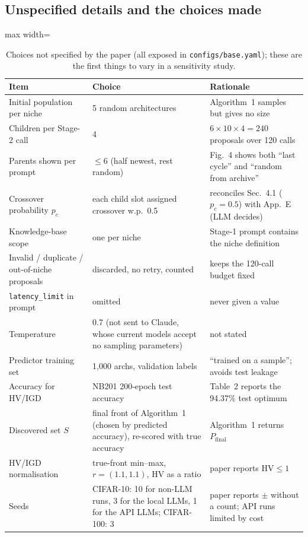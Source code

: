 \documentclass[preprint,12pt,authoryear]{elsarticle}
\newcommand{\code}[1]{\texttt{#1}}
\newcommand{\HV}{\mathrm{HV}}
\begin{document}
\subsection{Unspecified details and the choices made}\label{sec:assumed}
\begin{table}[h]\centering\small
\caption{Choices not specified by the paper (all exposed in \code{configs/base.yaml}); these are the first things to vary in a sensitivity study.}\label{tab:assumed}
\begin{adjustbox}{max width=\linewidth}
\begin{tabular}{p{4.6cm}p{4.0cm}p{6.2cm}}
\toprule
Item & Choice & Rationale \\
\midrule
Initial population per niche & 5 random architectures & Algorithm~1 samples but gives no size \\
Children per Stage-2 call & 4 & $6\times10\times4=240$ proposals over 120 calls \\
Parents shown per prompt & $\le6$ (half newest, rest random) & Fig.~4 shows both ``last cycle'' and ``random from archive'' \\
Crossover probability $p_c$ & each child slot assigned crossover w.p.\ 0.5 & reconciles Sec.~4.1 ($p_c{=}0.5$) with App.~E (LLM decides) \\
Knowledge-base scope & one per niche & Stage-1 prompt contains the niche definition \\
Invalid / duplicate / out-of-niche proposals & discarded, no retry, counted & keeps the 120-call budget fixed \\
\code{latency\_limit} in prompt & omitted & never given a value \\
Temperature & 0.7 (not sent to Claude, whose current models accept no sampling parameters) & not stated \\
Predictor training set & 1{,}000 archs, validation labels & ``trained on a sample''; avoids test leakage \\
Accuracy for HV/IGD & NB201 200-epoch test accuracy & Table~2 reports the 94.37\% test optimum \\
Discovered set $S$ & final front of Algorithm~1 (chosen by predicted accuracy), re-scored with true accuracy & Algorithm~1 returns $P_{\text{final}}$ \\
HV/IGD normalisation & true-front min--max, $r=(1.1,1.1)$, HV as a ratio & paper reports $\HV\le1$ \\
Seeds & CIFAR-10: 10 for non-LLM runs, 3 for the local LLMs, 1 for the API LLMs; CIFAR-100: 3 & paper reports $\pm$ without a count; API runs limited by cost \\
\bottomrule
\end{tabular}
\end{adjustbox}
\end{table}
\end{document}
